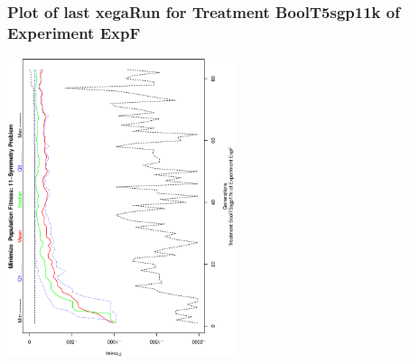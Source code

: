  \begin{frame}
 \frametitle{ Plot of last xegaRun for Treatment BoolT5sgp11k of Experiment ExpF }
 \begin{center}
\includegraphics[width=0.5\textwidth, angle=-90]
{ExpFPlotPopStatsFigure001.eps}
 \end{center}
 \label{report/ExpFPlotPopStatsFigure001.eps}  
 \end{frame}

